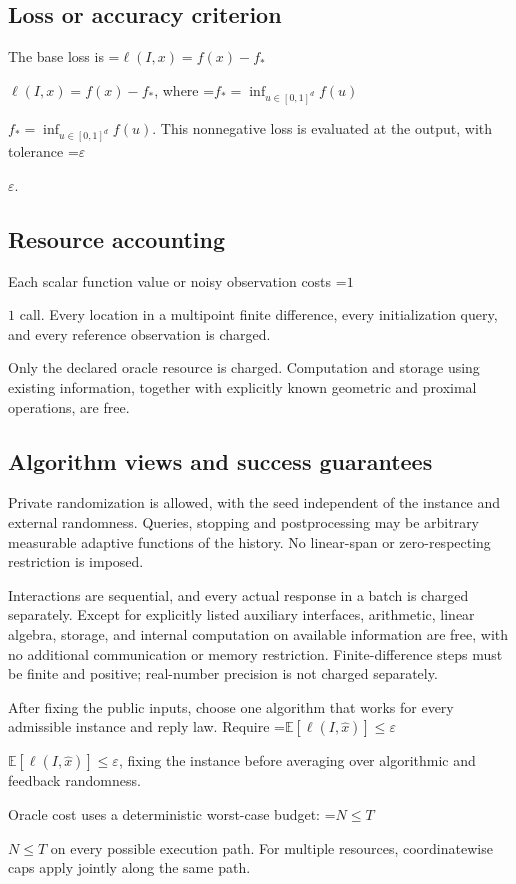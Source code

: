 \documentclass[10pt,a4paper]{article}
\newcommand{\AtlasMath}[1]{\par\begingroup\centering\setbox0=\hbox{$\displaystyle #1$}\ifdim\wd0>1.4\linewidth\typeout{ATLAS WIDE FORMULA: \the\wd0}\fi\ifdim\wd0>\linewidth\resizebox{\linewidth}{!}{\box0}\else\box0\fi\par\endgroup}
\newcommand{\AtlasInlineMath}[1]{\begingroup\setbox0=\hbox{$#1$}\ifdim\wd0>.4\linewidth\endgroup\AtlasMath{#1}\else\endgroup$#1$\fi}
\begin{document}
\subsection{Loss or accuracy criterion}
The base loss is \AtlasInlineMath{\ell(I,x)=f(x)-f_*}, where \AtlasInlineMath{f_*=\inf_{u\in [0,1]^d}f(u)}. This nonnegative loss is evaluated at the output, with tolerance \AtlasInlineMath{\varepsilon}.

\subsection{Resource accounting}
Each scalar function value or noisy observation costs \AtlasInlineMath{1} call. Every location in a multipoint finite difference, every initialization query, and every reference observation is charged.

Only the declared oracle resource is charged. Computation and storage using existing information, together with explicitly known geometric and proximal operations, are free.

\subsection{Algorithm views and success guarantees}
Private randomization is allowed, with the seed independent of the instance and external randomness. Queries, stopping and postprocessing may be arbitrary measurable adaptive functions of the history. No linear-span or zero-respecting restriction is imposed.

Interactions are sequential, and every actual response in a batch is charged separately. Except for explicitly listed auxiliary interfaces, arithmetic, linear algebra, storage, and internal computation on available information are free, with no additional communication or memory restriction. Finite-difference steps must be finite and positive; real-number precision is not charged separately.

After fixing the public inputs, choose one algorithm that works for every admissible instance and reply law. Require \AtlasInlineMath{\mathbb{E}[\ell(I,\widehat{x})]\le \varepsilon}, fixing the instance before averaging over algorithmic and feedback randomness.

Oracle cost uses a deterministic worst-case budget: \AtlasInlineMath{N\le T} on every possible execution path. For multiple resources, coordinatewise caps apply jointly along the same path.
\end{document}
